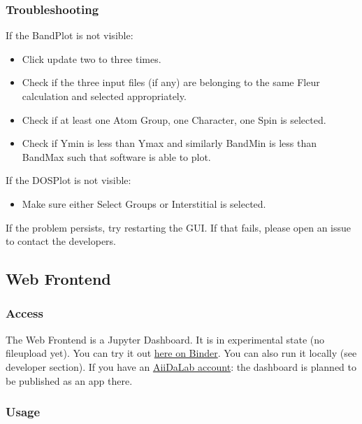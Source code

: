 \subsubsection{Troubleshooting}\label{troubleshooting}

If the BandPlot is not visible:

\begin{itemize}
    \tightlist
\item
    Click update two to three times.
\item
    Check if the three input files (if any) are belonging to the same
    Fleur calculation and selected appropriately.
\item
    Check if at least one Atom Group, one Character, one Spin is selected.
\item
    Check if Ymin is less than Ymax and similarly BandMin is less than
    BandMax such that software is able to plot.
\end{itemize}

If the DOSPlot is not visible:

\begin{itemize}
    \tightlist
\item Make sure either Select Groups or Interstitial is selected.
\end{itemize}

If the problem persists, try restarting the GUI. If that fails, please open an
issue to contact the developers.

\subsection{Web Frontend}\label{web-frontend}

\subsubsection{Access}\label{access}

The Web Frontend is a Jupyter Dashboard. It is in experimental state (no
fileupload yet). You can try it out
\href{https://mybinder.org/v2/gh/JuDFTteam/masci-tools/studentproject18ws?filepath=studentproject18w\%2Ffrontend\%2Fjupyter\%2Fdemo\%2Fbinder_demo.ipynb}{here
  on Binder}. You can also run it locally (see developer section). If you have an
\href{https://aiidalab.materialscloud.org/hub/login}{AiiDaLab account}: the
dashboard is planned to be published as an app there.

\subsubsection{Usage}\label{usage-1}

